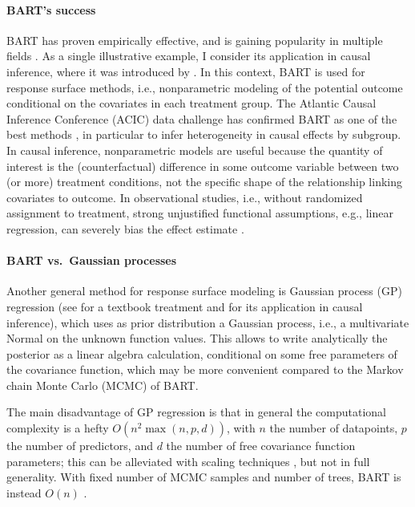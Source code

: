 \documentclass[a4paper]{article}
\theoremstyle{definition}
\let\oldmarginpar\marginpar
\renewcommand{\marginpar}[1]{\oldmarginpar{\sffamily\scriptsize #1}}
\renewcommand{\marginpar}[1]{\relax} %
\begin{document}
    \paragraph{BART's success}
    
    BART has proven empirically effective, and is gaining popularity in multiple fields \autocite[consider, e.g.,][]{tan2019}. As a single illustrative example, I consider its application in causal inference, where it was introduced by \textcite{hill2011}. In this context, BART is used for response surface methods, i.e., nonparametric modeling of the potential outcome conditional on the covariates in each treatment group. The Atlantic Causal Inference Conference (ACIC) data challenge has confirmed BART as one of the best methods \autocite{dorie2019,hahn2019,acic2019,thal2023}, in particular to infer heterogeneity in causal effects by subgroup. In causal inference, nonparametric models are useful because the quantity of interest is the (counterfactual) difference in some outcome variable between two (or more) treatment conditions, not the specific shape of the relationship linking covariates to outcome. In observational studies, i.e., without randomized assignment to treatment, strong unjustified functional assumptions, e.g., linear regression, can severely bias the effect estimate \autocite[\S14.7, p.~332]{imbens2015}.

    \paragraph{BART vs.\ Gaussian processes}
    
    Another general method for response surface modeling is Gaussian process (GP) regression (see \textcite{gramacy2020} for a textbook treatment and \textcite{linero2022b} for its application in causal inference), which uses as prior distribution a Gaussian process, i.e., a multivariate Normal on the unknown function values. This allows to write analytically the posterior as a linear algebra calculation, conditional on some free parameters of the covariance function, which may be more convenient compared to the Markov chain Monte Carlo (MCMC) of BART.

    The main disadvantage of GP regression is that in general the computational complexity is a hefty $O(n^2\max(n,p,d))$,\marginpar{Not sure about the $d$, maybe goes away with backprop.} with $n$ the number of datapoints, $p$ the number of predictors, and $d$ the number of free covariance function parameters; this can be alleviated with scaling techniques \autocite[ch.~9]{gramacy2020}, but not in full generality. With fixed number of MCMC samples and number of trees, BART is instead $O(n)$ \autocite[although these assumptions are too strong in practice, see][\S8, p.~25]{hill2020}.
    
\end{document}
